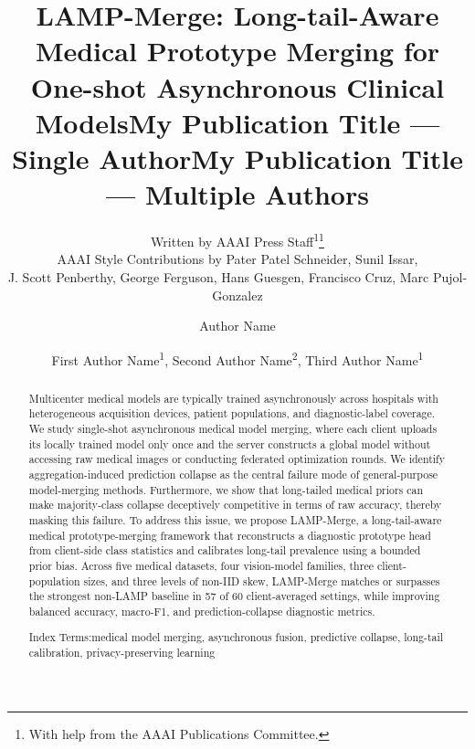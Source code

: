 \documentclass[letterpaper]{article} %
\title{LAMP-Merge: Long-tail-Aware Medical Prototype Merging for One-shot Asynchronous Clinical Models}
\author{
    Written by AAAI Press Staff\textsuperscript{\rm 1}\thanks{With help from the AAAI Publications Committee.}\\
    AAAI Style Contributions by Pater Patel Schneider,
    Sunil Issar,\\
    J. Scott Penberthy,
    George Ferguson,
    Hans Guesgen,
    Francisco Cruz\equalcontrib,
    Marc Pujol-Gonzalez\equalcontrib
}
\title{My Publication Title --- Single Author}
\author {
    Author Name
}
\title{My Publication Title --- Multiple Authors}
\author {
    First Author Name\textsuperscript{\rm 1},
    Second Author Name\textsuperscript{\rm 2},
    Third Author Name\textsuperscript{\rm 1}
}
\begin{document}
\maketitle

\begin{abstract}
%
Multicenter medical models are typically trained asynchronously across hospitals with heterogeneous acquisition devices, patient populations, and diagnostic-label coverage. We study single-shot asynchronous medical model merging, where each client uploads its locally trained model only once and the server constructs a global model without accessing raw medical images or conducting federated optimization rounds. We identify aggregation-induced prediction collapse as the central failure mode of general-purpose model-merging methods. Furthermore, we show that long-tailed medical priors can make majority-class collapse deceptively competitive in terms of raw accuracy, thereby masking this failure. To address this issue, we propose LAMP-Merge, a long-tail-aware medical prototype-merging framework that reconstructs a diagnostic prototype head from client-side class statistics and calibrates long-tail prevalence using a bounded prior bias. Across five medical datasets, four vision-model families, three client-population sizes, and three levels of non-IID skew, LAMP-Merge matches or surpasses the strongest non-LAMP baseline in 57 of 60 client-averaged settings, while improving balanced accuracy, macro-F1, and prediction-collapse diagnostic metrics.

Index Terms:medical model merging, asynchronous fusion, predictive collapse, long-tail calibration, privacy-preserving learning
\end{abstract}


\end{document}
